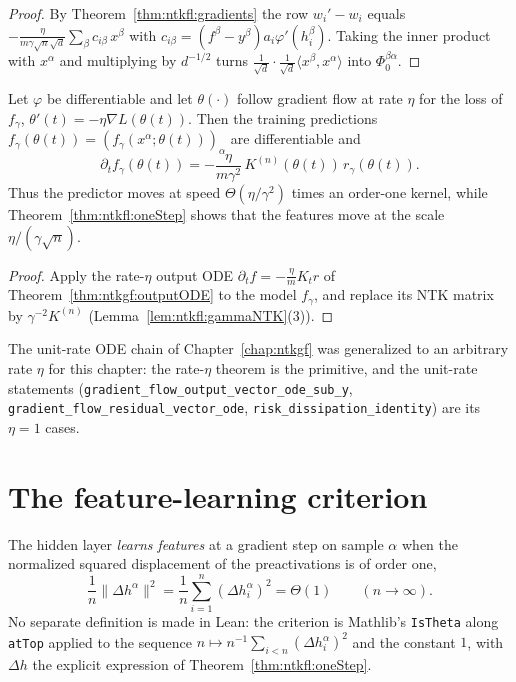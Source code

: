 \begin{proof}
  \leanok
By Theorem~\ref{thm:ntkfl:gradients} the row $w_i'-w_i$ equals $-\frac{\eta}{m\gamma\sqrt n\sqrt d}\sum_\beta c_{i\beta}\,x^\beta$ with
$c_{i\beta}=(f^\beta-y^\beta)a_i\varphi'(h_i^\beta)$. Taking the inner product with $x^\alpha$ and multiplying by $d^{-1/2}$ turns
$\frac1{\sqrt d}\cdot\frac1{\sqrt d}\langle x^\beta,x^\alpha\rangle$ into $\Phi_0^{\beta\alpha}$.
\end{proof}

\begin{theorem}\label{thm:ntkfl:predictorODE}
  \leanok
Let $\varphi$ be differentiable and let $\theta(\cdot)$ follow gradient flow at rate $\eta$ for the loss of $f_\gamma$, $\theta'(t)=-\eta\nabla L(\theta(t))$. Then the training predictions
$f_\gamma(\theta(t))=(f_\gamma(x^\alpha;\theta(t)))_\alpha$ are differentiable and
\[
  \partial_tf_\gamma(\theta(t))=-\frac{\eta}{m\gamma^2}\,K^{(n)}(\theta(t))\,r_\gamma(\theta(t)).
\]
Thus the predictor moves at speed $\Theta(\eta/\gamma^2)$ times an order-one kernel, while Theorem~\ref{thm:ntkfl:oneStep}
shows that the features move at the scale $\eta/(\gamma\sqrt n)$.
\end{theorem}

\begin{proof}
  \leanok
Apply the rate-$\eta$ output ODE $\partial_tf=-\frac\eta mK_tr$ of Theorem~\ref{thm:ntkgf:outputODE} to the model $f_\gamma$, and replace its NTK matrix by $\gamma^{-2}K^{(n)}$ (Lemma~\ref{lem:ntkfl:gammaNTK}(3)).
\end{proof}

\begin{remark}[Reuse]
The unit-rate ODE chain of Chapter~\ref{chap:ntkgf} was generalized to an arbitrary rate $\eta$ for this chapter: the rate-$\eta$ theorem is the primitive,
and the unit-rate statements (\texttt{gradient\_flow\_output\_vector\_ode\_sub\_y}, \texttt{gradient\_flow\_residual\_vector\_ode},
\texttt{risk\_dissipation\_identity}) are its $\eta=1$ cases.
\end{remark}


\section{The feature-learning criterion}\label{sec:ntkfl:criterion}

\begin{remark}\label{def:ntkfl:criterion}
The hidden layer \emph{learns features} at a gradient step on sample $\alpha$ when the normalized squared displacement of the preactivations
is of order one,
\[
  \frac1n\|\Delta h^\alpha\|^2=\frac1n\sum_{i=1}^n(\Delta h_i^\alpha)^2=\Theta(1)\qquad(n\to\infty).
\]
No separate definition is made in Lean: the criterion is Mathlib's \texttt{IsTheta} along \texttt{atTop} applied to the sequence $n\mapsto n^{-1}\sum_{i<n}(\Delta h_i^\alpha)^2$ and the constant $1$,
with $\Delta h$ the explicit expression of Theorem~\ref{thm:ntkfl:oneStep}.
\end{remark}

